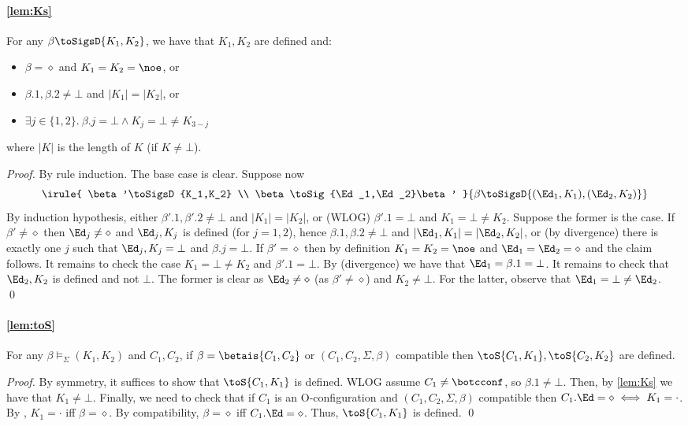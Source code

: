 \paragraph{\cref{lem:Ks}}
  For any $\beta\toSigsD{K_1,K_2}$, we have that $K_1,K_2$ are defined and:
  \begin{itemize}
    \item $\beta=\diamond$ and $K_1=K_2=\noe$, or
    \item $\beta.1,\beta.2\neq\bot$ and 
      $|K_1|=|K_2|$, or
      \item $\exists j\in\{1,2\}.\ \beta.j=\bot \land K_j=\bot\neq K_{3-j}$
\end{itemize}
where $|K|$ is the length of $K$ (if $K\neq\bot$). 
\begin{proof}
  By rule induction. The base case is clear. Suppose now
  \[
      \irule{
      \beta'\toSigsD{K_1,K_2}
      \\
      \beta\toSig{\Ed_1,\Ed_2}\beta'
    }{
      \beta\toSigsD{(\Ed_1,K_1),(\Ed_2,K_2)}
    }
  \]
  By induction hypothesis, either $\beta'.1,\beta'.2\neq\bot$ and $|K_1|=|K_2|$, or (WLOG)
$\beta'.1=\bot$ and 
$K_1=\bot\neq K_2$. Suppose
the former is the case.
If $\beta'\neq\diamond$ then $\Ed_j\neq\diamond$ and $\Ed_j,K_j$ is defined (for $j=1,2$), hence
$\beta.1,\beta.2\neq\bot$ and
$|\Ed_1,K_1|=|\Ed_2,K_2|$, or (by divergence) there is exactly one $j$ such that  $\Ed_j,K_j=\bot$ and $\beta.j=\bot$. If $\beta'=\diamond$ then by definition $K_1=K_2=\noe$ and $\Ed_1=\Ed_2=\diamond$ and the claim follows. It remains to check the case $K_1=\bot\neq K_2$ and $\beta'.1=\bot$. By  (divergence) we have that $\Ed_1=\beta.1=\bot$. It remains to check that $\Ed_2,K_2$ is defined and not $\bot$. The former is clear as $\Ed_2\neq\diamond$ (as $\beta'\neq\diamond$) and $K_2\neq\bot$. For the latter, observe that $\Ed_1=\bot\neq\Ed_2$. \qed
\end{proof}

\paragraph{\cref{lem:toS}}
  For any $\beta\models_\Sigma(K_1,K_2)$ and $C_1,C_2$, if $\beta=\betais{C_1,C_2}$ or $(C_1,C_2,\Sigma,\beta)$ compatible
  then $\toS{C_1,K_1},\toS{C_2,K_2}$ are defined.
\begin{proof}
  By symmetry, it suffices to show that $\toS{C_1,K_1}$ is defined. WLOG assume $C_1\neq\botcconf$, so $\beta.1\neq\bot$. Then, by \cref{lem:Ks} we have that $K_1\neq\bot$. Finally, we need to check that if $C_1$ is an O-configuration and $(C_1,C_2,\Sigma,\beta)$ compatible then $C_1.\Ed=\diamond\iff K_1=\cdot$. By , $K_1=\cdot$ iff $\beta=\diamond$. By compatibility,  $\beta=\diamond$ iff $C_1.\Ed=\diamond$.
Thus,  $\toS{C_1,K_1}$ is defined. \qed
\end{proof}

